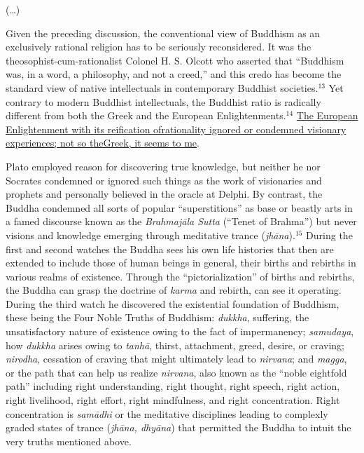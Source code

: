 \begin{myquote}
(…)
\end{myquote}

\begin{myquote}
Given the preceding discussion, the conventional view of Buddhism as an exclusively rational religion has to be seriously reconsidered. It was the theosophist-cum-rationalist Colonel H. S. Olcott who asserted that “Buddhism was, in a word, a philosophy, and not a creed,” and this credo has become the standard view of native intellectuals in contemporary Buddhist societies.$^{13}$ Yet contrary to modern Buddhist intellectuals, the Buddhist ratio is radically different from both the Greek and the European Enlightenments.$^{14}$ \underline{The European Enlightenment with its reification of}\break \underline{rationality ignored or condemned visionary experiences; not so the}\break \underline{Greek, it seems to me}.
\end{myquote}

\begin{myquote}
Plato employed reason for discovering true knowledge, but neither he nor Socrates condemned or ignored such things as the work of visionaries and prophets and personally believed in the oracle at Delphi. By contrast, the Buddha condemned all sorts of popular “superstitions” as base or beastly arts in a famed discourse known as the \textit{Brahmajāla Sutta} (“Tenet of Brahma”) but never visions and knowledge emerging through meditative trance (\textit{jhāna}).$^{15}$ During the first and second watches the Buddha sees his own life histories that then are extended to include those of human beings in general, their births and rebirths in various realms of existence. Through the “pictorialization” of births and rebirths, the Buddha can grasp the doctrine of \textit{karma} and rebirth, can see it operating. During the third watch he discovered the existential foundation of Buddhism, these being the Four Noble Truths of Buddhism: \textit{dukkha}, suffering, the unsatisfactory nature of existence owing to the fact of impermanency; \textit{samudaya}, how \textit{dukkha} arises owing to \textit{tanhā}, thirst, attachment, greed, desire, or craving; \textit{nirodha}, cessation of craving that might ultimately lead to \textit{nirvana}; and \textit{magga}, or the path that can help us realize \textit{nirvana}, also known as the “noble eightfold path” including right understanding, right thought, right speech, right action, right livelihood, right effort, right mindfulness, and right concentration. Right concentration is \textit{samādhi} or the meditative disciplines leading to complexly graded states of trance (\textit{jhāna, dhyāna}) that permitted the Buddha to intuit the very truths mentioned above.
\end{myquote}

